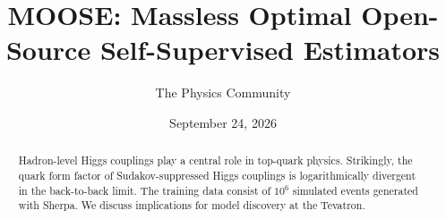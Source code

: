 \documentclass[11pt]{article}
\title{MOOSE: Massless Optimal Open-Source Self-Supervised Estimators}
\author{The Physics Community}
\date{September 24, 2026}
\numberwithin{equation}{section}
\theoremstyle{definition}
\theoremstyle{remark}
\begin{document}
\maketitle
\begin{abstract}
Hadron-level Higgs couplings play a central role in top-quark physics.
Strikingly, the quark form factor of Sudakov-suppressed Higgs couplings
is logarithmically divergent in the back-to-back limit. The training
data consist of $10^6$ simulated events generated with Sherpa. We
discuss implications for model discovery at the Tevatron.
\end{abstract}
\tableofcontents





\nocite{*}


\end{document}
